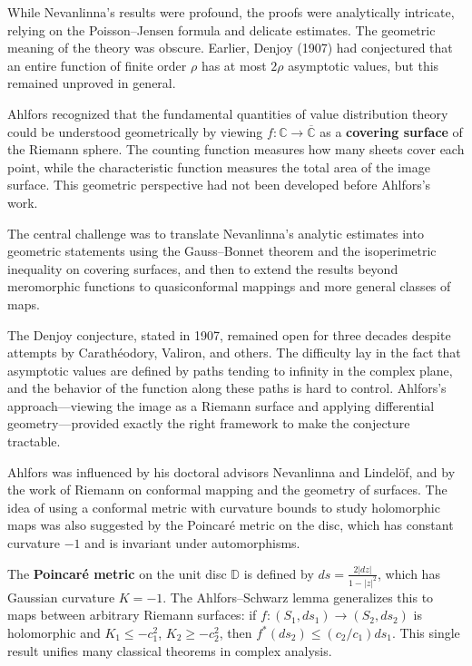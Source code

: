 While Nevanlinna's results were profound, the proofs were analytically intricate, relying on the Poisson--Jensen formula and delicate estimates. The geometric meaning of the theory was obscure. Earlier, Denjoy (1907) \cite{ahlfors1936} had conjectured that an entire function of finite order $\rho$ has at most $2\rho$ asymptotic values, but this remained unproved in general.

Ahlfors \cite{ahlfors1936} recognized that the fundamental quantities of value distribution theory could be understood geometrically by viewing $f: \mathbb{C} \to \overline{\mathbb{C}}$ as a \textbf{covering surface} of the Riemann sphere. The counting function measures how many sheets cover each point, while the characteristic function measures the total area of the image surface. This geometric perspective had not been developed before Ahlfors's work.

The central challenge was to translate Nevanlinna's analytic estimates into geometric statements using the Gauss--Bonnet theorem and the isoperimetric inequality on covering surfaces, and then to extend the results beyond meromorphic functions to quasiconformal mappings and more general classes of maps.

The Denjoy conjecture, stated in 1907, remained open for three decades despite attempts by Carath\'{e}odory, Valiron, and others. The difficulty lay in the fact that asymptotic values are defined by paths tending to infinity in the complex plane, and the behavior of the function along these paths is hard to control. Ahlfors's approach---viewing the image as a Riemann surface and applying differential geometry---provided exactly the right framework to make the conjecture tractable.

Ahlfors was influenced by his doctoral advisors Nevanlinna and Lindel\"{o}f, and by the work of Riemann on conformal mapping and the geometry of surfaces. The idea of using a conformal metric with curvature bounds to study holomorphic maps was also suggested by the Poincar\'{e} metric on the disc, which has constant curvature $-1$ and is invariant under automorphisms.

The \textbf{Poincar\'{e} metric} on the unit disc $\mathbb{D}$ is defined by $ds = \frac{2|dz|}{1-|z|^2}$, which has Gaussian curvature $K = -1$. The Ahlfors--Schwarz lemma generalizes this to maps between arbitrary Riemann surfaces: if $f: (S_1, ds_1) \to (S_2, ds_2)$ is holomorphic and $K_1 \leq -c_1^2$, $K_2 \geq -c_2^2$, then $f^*(ds_2) \leq (c_2/c_1) ds_1$. This single result unifies many classical theorems in complex analysis.

